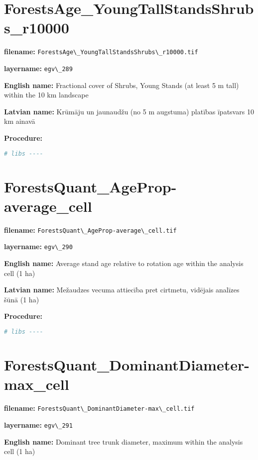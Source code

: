 \documentclass[
]{book}
\newcommand{\passthrough}[1]{#1}
\begin{document}
\section{ForestsAge\_YoungTallStandsShrubs\_r10000}\label{ch06.289}

\textbf{filename:} \passthrough{\lstinline!ForestsAge\_YoungTallStandsShrubs\_r10000.tif!}

\textbf{layername:} \passthrough{\lstinline!egv\_289!}

\textbf{English name:} Fractional cover of Shrubs, Young Stands (at least 5 m tall) within the 10 km landscape

\textbf{Latvian name:} Krūmāju un jaunaudžu (no 5 m augstuma) platības īpatsvars 10 km ainavā

\textbf{Procedure:}

\begin{lstlisting}[language=R]
# libs ----
\end{lstlisting}

\section{ForestsQuant\_AgeProp-average\_cell}\label{ch06.290}

\textbf{filename:} \passthrough{\lstinline!ForestsQuant\_AgeProp-average\_cell.tif!}

\textbf{layername:} \passthrough{\lstinline!egv\_290!}

\textbf{English name:} Average stand age relative to rotation age within the analysis cell (1 ha)

\textbf{Latvian name:} Mežaudzes vecuma attiecība pret cirtmetu, vidējais analīzes šūnā (1 ha)

\textbf{Procedure:}

\begin{lstlisting}[language=R]
# libs ----
\end{lstlisting}

\section{ForestsQuant\_DominantDiameter-max\_cell}\label{ch06.291}

\textbf{filename:} \passthrough{\lstinline!ForestsQuant\_DominantDiameter-max\_cell.tif!}

\textbf{layername:} \passthrough{\lstinline!egv\_291!}

\textbf{English name:} Dominant tree trunk diameter, maximum within the analysis cell (1 ha)
\end{document}
